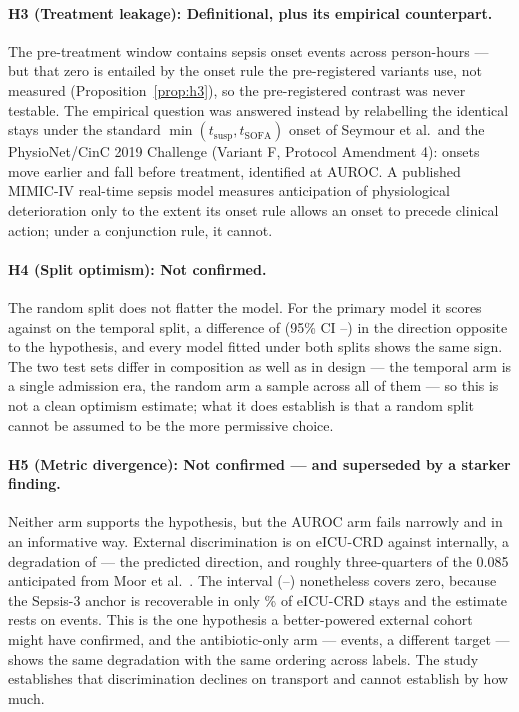 \paragraph{H3 (Treatment leakage): Definitional, plus its empirical counterpart.}
The pre-treatment window contains \pcPreTreatOnsetsVarB{} sepsis onset events
across \pcPreTreatPersonHoursVarB{} person-hours --- but that zero is entailed by
the onset rule the pre-registered variants use, not measured
(Proposition~\ref{prop:h3}), so the pre-registered contrast was never testable.
The empirical question was answered instead by relabelling the identical stays
under the standard $\min(t_{\text{susp}}, t_{\text{SOFA}})$ onset of Seymour et
al.\ and the PhysioNet/CinC 2019 Challenge (Variant F, Protocol Amendment 4):
\pcFNMovedEarlier{} onsets move earlier and \pcPreTreatOnsetsVarF{} fall before
treatment, identified at \pcPreTreatAurocPrimaryF{} AUROC. A published MIMIC-IV
real-time sepsis model measures anticipation of physiological deterioration only
to the extent its onset rule allows an onset to precede clinical action; under a
conjunction rule, it cannot.

\paragraph{H4 (Split optimism): Not confirmed.}
The random split does not flatter the model. For the primary model it scores
\pcAurocRandomPrimaryB{} against \pcAurocPrimaryB{} on the temporal split, a
difference of \pcHFourEst{} (95\% CI \pcHFourCiLo--\pcHFourCiHi) in the
direction opposite to the hypothesis, and every model fitted under both splits
shows the same sign. The two test sets differ in composition as well as in
design --- the temporal arm is a single admission era, the random arm a sample
across all of them --- so this is not a clean optimism estimate; what it does
establish is that a random split cannot be assumed to be the more permissive
choice.

\paragraph{H5 (Metric divergence): Not confirmed --- and superseded by a starker
finding.}
Neither arm supports the hypothesis, but the AUROC arm fails narrowly and in an
informative way. External discrimination is \pcExtAurocPrimaryB{} on eICU-CRD
against \pcAurocPrimaryB{} internally, a degradation of \pcHFiveEst{} --- the
predicted direction, and roughly three-quarters of the 0.085 anticipated from
Moor et al.\ \cite{moor2023review}. The interval (\pcHFiveCiLo--\pcHFiveCiHi)
nonetheless covers zero, because the Sepsis-3 anchor is recoverable in only
\pcExtMicroCoverage\% of eICU-CRD stays and the estimate rests on
\pcExtNEventsB{} events. This is the one hypothesis a better-powered external
cohort might have confirmed, and the antibiotic-only arm --- \pcExtAbxNEventsB{}
events, a different target --- shows the same degradation with the same ordering
across labels. The study establishes that discrimination declines on transport
and cannot establish by how much.

